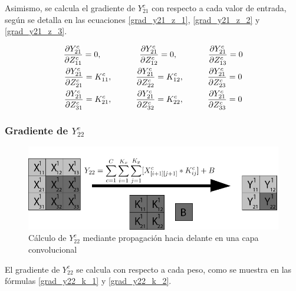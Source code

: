 Asimismo, se calcula el gradiente de $Y^c_{21}$ con respecto a cada valor de entrada, según se detalla en las ecuaciones \ref{grad_y21_z_1}, \ref{grad_y21_z_2} y \ref{grad_y21_z_3}.
 
\begin{gather}
	\frac{\partial Y^c_{21}}{\partial Z^c_{11}} = 0, \hspace{16mm} \frac{\partial Y^c_{21}}{\partial Z^c_{12}} = 0, \hspace{13mm} \frac{\partial Y^c_{21}}{\partial Z^c_{13}} = 0 \label{grad_y21_z_1} \\
	\frac{\partial Y^c_{21}}{\partial Z^c_{21}} = K^c_{11}, \hspace{10mm} \frac{\partial Y^c_{21}}{\partial Z^c_{22}} = K^c_{12}, \hspace{10mm} \frac{\partial Y^c_{21}}{\partial Z^c_{23}} = 0 \label{grad_y21_z_2} \\
	\frac{\partial Y^c_{21}}{\partial Z^c_{31}} = K^c_{21}, \hspace{10mm} \frac{\partial Y^c_{21}}{\partial Z^c_{32}} = K^c_{22}, \hspace{10mm} \frac{\partial Y^c_{21}}{\partial Z^c_{33}} = 0 \label{grad_y21_z_3}
\end{gather}


\subsubsection{Gradiente de $Y^c_{22}$}

\begin{figure}[H]
	\centering
	\includegraphics[width=1\linewidth]{imagenes/conv_ejemplo_backprop_4.jpg} 
	\caption{Cálculo de $Y^c_{22}$ mediante propagación hacia delante en una capa convolucional}
	\label{fig:ejemplo_4_forward_prop_convolucional}
\end{figure}

El gradiente de $Y^c_{22}$ se calcula con respecto a cada peso, como se muestra en las fórmulas \ref{grad_y22_k_1} y \ref{grad_y22_k_2}.

